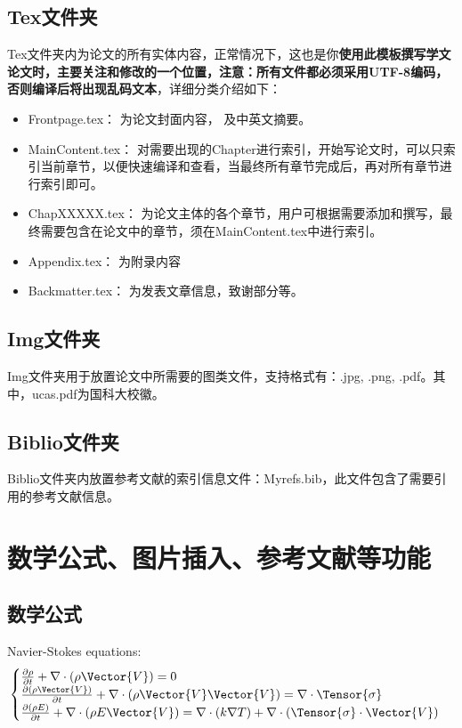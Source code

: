\subsection{Tex文件夹}

Tex文件夹内为论文的所有实体内容，正常情况下，这也是你\textbf{使用此模板撰写学文论文时，主要关注和修改的一个位置，注意：所有文件都必须采用UTF-8编码，否则编译后将出现乱码文本}，详细分类介绍如下：

\begin{itemize}
  \item Frontpage.tex： 为论文封面内容， 及中英文摘要。
  \item Main\textunderscore Content.tex： 对需要出现的Chapter进行索引，开始写论文时，可以只索引当前章节，以便快速编译和查看，当最终所有章节完成后，再对所有章节进行索引即可。
  \item Chap\textunderscore XXXXX.tex： 为论文主体的各个章节，用户可根据需要添加和撰写，最终需要包含在论文中的章节，须在Main\textunderscore Content.tex中进行索引。
  \item Appendix.tex： 为附录内容
  \item Backmatter.tex： 为发表文章信息，致谢部分等。
\end{itemize}

\subsection{Img文件夹}

Img文件夹用于放置论文中所需要的图类文件，支持格式有：.jpg, .png, .pdf。其中，ucas.pdf为国科大校徽。

\subsection{Biblio文件夹}

Biblio文件夹内放置参考文献的索引信息文件：Myrefs.bib，此文件包含了需要引用的参考文献信息。

\section{数学公式、图片插入、参考文献等功能}

\subsection{数学公式}

Navier-Stokes equations:
\begin{equation} \label{eq:ns}
    \begin{cases}
        \frac{\partial \rho}{\partial t} + \nabla\cdot(\rho\Vector{V}) = 0 \\
        \frac{\partial (\rho\Vector{V})}{\partial t} + \nabla\cdot(\rho\Vector{V}\Vector{V}) = \nabla\cdot\Tensor{\sigma}\\
        \frac{\partial (\rho E)}{\partial t} + \nabla\cdot(\rho E\Vector{V}) = \nabla\cdot(k\nabla T) + \nabla\cdot(\Tensor{\sigma}\cdot\Vector{V})
    \end{cases}
\end{equation}

